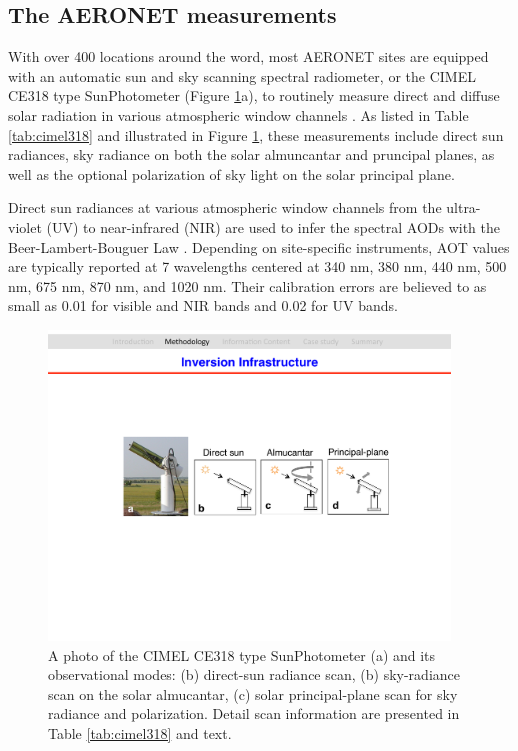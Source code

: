 \subsection{The AERONET measurements} \label{subsec:cimel318}

With over 400 locations around the word, most AERONET sites are equipped with
an automatic sun and sky scanning spectral radiometer, or the CIMEL CE318 type
SunPhotometer (Figure \ref{fig:cimel318}a), to routinely measure direct and 
diffuse solar radiation in various atmospheric window channels \citep{Holben98}. 
As listed in Table \ref{tab:cimel318} and illustrated in Figure \ref{fig:cimel318}, these
measurements include direct sun radiances, sky radiance on both the solar
almuncantar and pruncipal planes, as well as the optional polarization of sky
light on the solar principal plane.

Direct sun radiances at various atmospheric window channels from the
ultra-violet (UV) to near-infrared (NIR) are used to infer the spectral AODs with the
Beer-Lambert-Bouguer Law \citep{Holben98,Smirnov00}. Depending on site-specific
instruments, AOT values are typically reported at 7 wavelengths centered at 340
nm, 380 nm, 440 nm, 500 nm, 675 nm, 870 nm, and 1020 nm. Their calibration
errors are believed to as small as 0.01 for visible and NIR bands and 0.02 for
UV bands.

\begin{figure}[t]
  \centering
  \includegraphics[width={0.95\textwidth}]{figures/cimel318.pdf}
  \caption{A photo of the CIMEL CE318 type SunPhotometer (a) and its 
observational modes: (b) direct-sun radiance scan, (b) sky-radiance scan
on the solar almucantar, (c) solar principal-plane scan for sky radiance
and polarization. Detail scan information are presented in Table
\ref{tab:cimel318} and text.}
  \label{fig:cimel318}
\end{figure}

